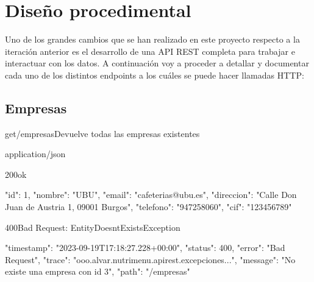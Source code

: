 
\section{Diseño procedimental}

Uno de los grandes cambios que se han realizado en este proyecto respecto a la iteración anterior es el desarrollo de una API REST completa para trabajar e interactuar con los datos. A continuación voy a proceder a detallar y documentar cada uno de los distintos endpoints a los cuáles se puede hacer llamadas HTTP:


\subsection{Empresas}

\begin{apiRoute}{get}{/empresas}{Devuelve todas las empresas existentes}
	
	\begin{routeParameter}
	\end{routeParameter}
	
	\begin{routeResponse}{application/json}
		\begin{routeResponseItem}{200}{ok}
			\begin{routeResponseItemBody}
{
	"id": 1,
	"nombre": "UBU",
	"email": "cafeterias@ubu.es",
	"direccion": "Calle Don Juan de Austria 1, 09001 Burgos",
	"telefono": "947258060",
	"cif": "123456789"
}
			\end{routeResponseItemBody}
		\end{routeResponseItem}
		\begin{routeResponseItem}{400}{Bad Request: EntityDoesntExistsException}
			\begin{routeResponseItemBody}
{
    "timestamp": "2023-09-19T17:18:27.228+00:00",
    "status": 400,
    "error": "Bad Request",
    "trace": "ooo.alvar.nutrimenu.apirest.excepciones...",
    "message": "No existe una empresa con id 3",
    "path": "/empresas"
}
			\end{routeResponseItemBody}
		\end{routeResponseItem}
	\end{routeResponse}
	
\end{apiRoute}

